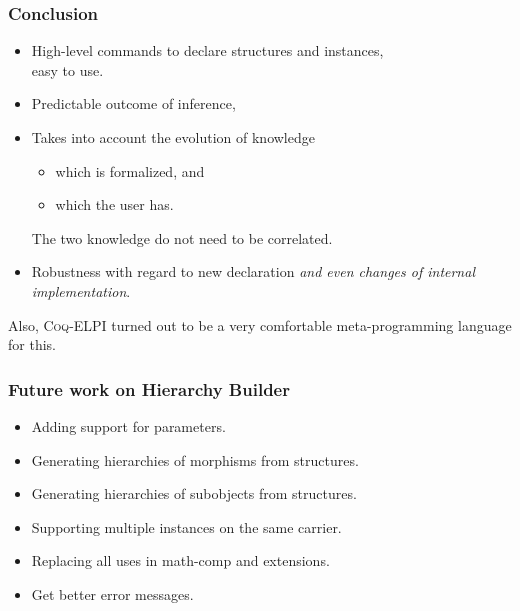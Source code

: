 \documentclass[11pt]{beamer}
\begin{document}
\begin{frame}
  \frametitle{Conclusion}
  
  \begin{itemize}
  \item High-level commands to declare structures and instances, \\
    easy to use.
    \vfill
  \item Predictable outcome of inference,
    \vfill
  \item Takes into account the evolution of knowledge
    \begin{itemize}
    \item which is formalized, and
    \item which the user has.
    \end{itemize}
    The two knowledge do not need to be correlated.
    \vfill
  \item Robustness with regard to new declaration \emph{and even changes of
    internal implementation}.
  \end{itemize}
  
  \vfill\pause
  Also, \textsc{Coq-ELPI} turned out to be a very comfortable
  meta-programming language for this.

\end{frame}

\begin{frame}
  \frametitle{Future work on Hierarchy Builder}
  \begin{itemize}
  \item Adding support for parameters.
    \vfill
  \item Generating hierarchies of morphisms from structures.
    \vfill
  \item Generating hierarchies of subobjects from structures.
    \vfill
  \item Supporting multiple instances on the same carrier.
    \vfill
  \item Replacing all uses in math-comp and extensions.
    \vfill
  \item Get better error messages.
  \end{itemize}
\end{frame}
\end{document}
